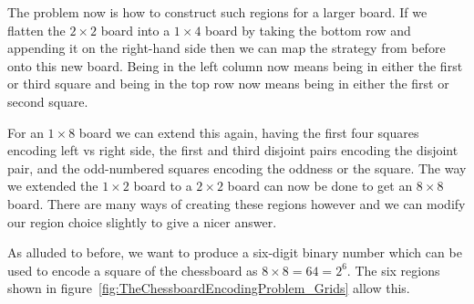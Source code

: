 The problem now is how to construct such regions for a larger board. If we flatten the $2 \times 2$ board into a $1 \times 4$ board by taking the bottom row and appending it on the right-hand side then we can map the strategy from before onto this new board. Being in the left column now means being in either the first or third square and being in the top row now means being in either the first or second square.

For an $1 \times 8$ board we can extend this again, having the first four squares encoding left vs right side, the first and third disjoint pairs encoding the disjoint pair, and the odd-numbered squares encoding the oddness or the square. The way we extended the $1 \times 2$ board to a $2 \times 2$ board can now be done to get an $8 \times 8$ board. There are many ways of creating these regions however and we can modify our region choice slightly to give a nicer answer.

As alluded to before, we want to produce a six-digit binary number which can be used to encode a square of the chessboard as $8 \times 8 = 64 = 2^6$. The six regions shown in figure~\ref{fig:TheChessboardEncodingProblem_Grids} allow this.

